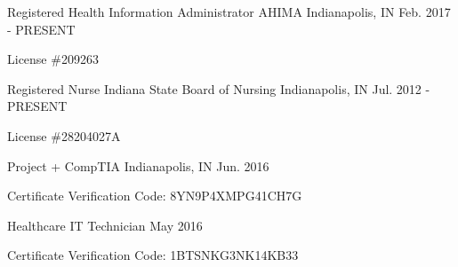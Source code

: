 

\begin{cventries}

  \cventry
    {Registered Health Information Administrator} %
    {AHIMA} %
    {Indianapolis, IN} %
    {Feb. 2017 - PRESENT} %
    {
      \begin{cvitems} %
        \item {License \#209263}
      \end{cvitems}
    }

  \cventry
    {Registered Nurse} %
    {Indiana State Board of Nursing} %
    {Indianapolis, IN} %
    {Jul. 2012 - PRESENT} %
    {
      \begin{cvitems} %
        \item {License \#28204027A}
      \end{cvitems}
    }

  \cventry
    {Project +} %
    {CompTIA} %
    {Indianapolis, IN} %
    {Jun. 2016} %
    {
      \begin{cvitems} %
        \item {Certificate Verification Code: 8YN9P4XMPG41CH7G}
      \end{cvitems}
    }

  \cventry
    {Healthcare IT Technician} %
    {} %
    {} %
    {May 2016} %
    {
      \begin{cvitems} %
        \item {Certificate Verification Code: 1BTSNKG3NK14KB33}
      \end{cvitems}
    }

%
\end{cventries}
